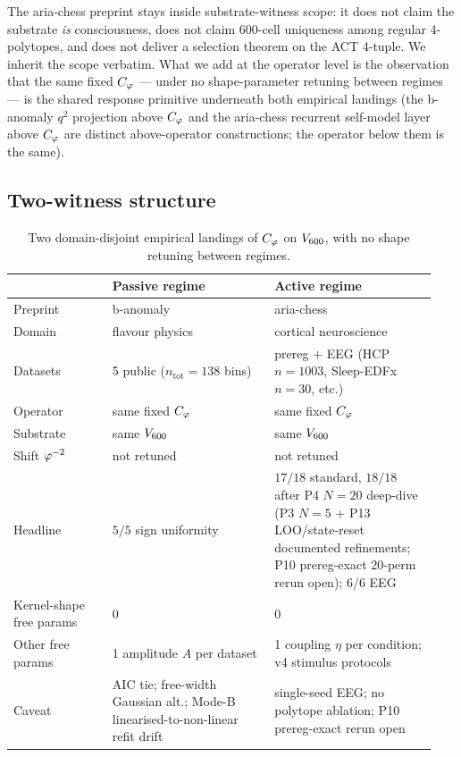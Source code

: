 The aria-chess preprint stays inside substrate-witness scope: it
does not claim the substrate \emph{is} consciousness, does not
claim 600-cell uniqueness among regular 4-polytopes, and does not
deliver a selection theorem on the ACT 4-tuple. We inherit the
scope verbatim. What we add at the operator level is the
observation that the same fixed $C_{\varphi}$ — under no shape-parameter
retuning between regimes — is the shared response primitive
underneath both empirical landings (the b-anomaly $q^{2}$
projection above $C_{\varphi}$ and the aria-chess recurrent self-model
layer above $C_{\varphi}$ are distinct above-operator constructions; the
operator below them is the same).

\subsection{Two-witness structure}

\begin{table}[ht]
\centering
\small
\caption{Two domain-disjoint empirical landings of $C_{\varphi}$ on
$V_{600}$, with no shape retuning between regimes.}
\label{tab:two_witness}
\begin{tabular}{p{0.22\linewidth} p{0.36\linewidth} p{0.36\linewidth}}
\toprule
& Passive regime & Active regime \\
\midrule
Preprint           & b-anomaly~\citep{SmartBAnomaly2026} & aria-chess~\citep{SmartAriaChess2026} \\
Domain             & flavour physics                    & cortical neuroscience \\
Datasets           & 5 public ($n_{\mathrm{tot}}=138$ bins) & prereg + EEG (HCP $n=1003$, Sleep-EDFx $n=30$, etc.) \\
Operator           & same fixed $C_{\varphi}$                  & same fixed $C_{\varphi}$ \\
Substrate          & same $V_{600}$                & same $V_{600}$ \\
Shift $\varphi^{-2}$   & not retuned                        & not retuned \\
Headline           & $5/5$ sign uniformity              & $17/18$ standard, $18/18$ after P4 $N\!=\!20$ deep-dive (P3 $N\!=\!5$ + P13 LOO/state-reset documented refinements; P10 prereg-exact $20$-perm rerun open); $6/6$ EEG \\
Kernel-shape free params & 0                            & 0 \\
Other free params  & 1 amplitude $A$ per dataset        & 1 coupling $\eta$ per condition; v4 stimulus protocols \\
Caveat             & AIC tie; free-width Gaussian alt.; Mode-B linearised-to-non-linear refit drift & single-seed EEG; no polytope ablation; P10 prereg-exact rerun open \\
\bottomrule
\end{tabular}
\end{table}


